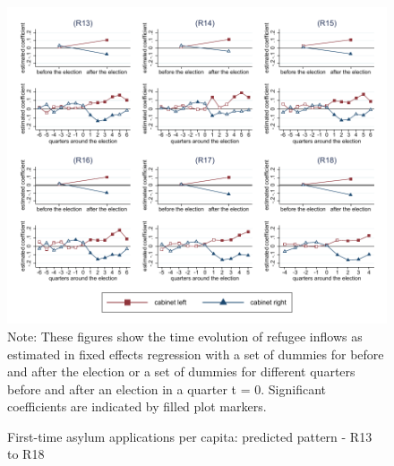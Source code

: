 \documentclass[11pt,a4paper]{scrartcl}
\begin{document}
\clearpage
\FloatBarrier
\begin{figure}[!ht]
	\caption{First-time asylum applications per capita: predicted pattern - R13 to R18}
	\includegraphics[width=1\textwidth]{../results/applications/app_graphs_R13-R18.pdf}
	\footnotesize{Note: These figures show the time evolution of refugee inflows as estimated in fixed effects regression
		with a set of dummies for before and after the election or a set of dummies for different quarters before and after an election in a quarter t = 0. Significant coefficients are indicated by filled plot markers.}
\end{figure}

\clearpage
\FloatBarrier




\clearpage
\FloatBarrier

\end{document}
